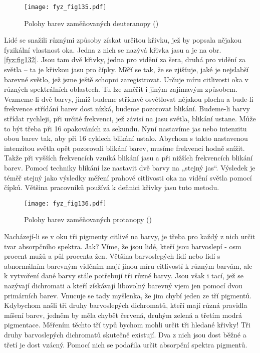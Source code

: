     \begin{figure}[ht!]   %
      \centering
      \texttt{[image: fyz\_fig135.pdf]}
      \caption{Polohy barev zaměňovaných deuteranopy
              (\cite[s.~476]{Feynman01})}
      \label{fyz:fig135}
    \end{figure}
    Lidé se snažili různými způsoby získat určitou křivku, jež by popsala 
    nějakou fyzikální vlastnost oka. Jedna z nich se nazývá křivka jasu a je na obr. 
    \ref{fyz:fig132}. Jsou tam dvě křivky, jedna pro vidění za šera, druhá pro vidění za světla – 
    ta je křivkou jasu pro čípky. Měří se tak, že se zjišťuje, jaké je nejslabší barevné světlo, 
    jež jsme ještě schopni zaregistrovat. Určuje míru citlivosti oka v různých spektrálních 
    oblastech. Tu lze změřit i jiným zajímavým způsobem. Vezmeme-li dvě barvy, jimiž budeme 
    střídavě osvětlovat nějakou plochu a bude-li frekvence střídání barev dost nízká, budeme 
    pozorovat blikání. Budeme-li barvy střídat rychleji, při určité frekvenci, jež závisí na jasu 
    světla, blikání ustane. Může to být třeba při \num{16} opakováních za sekundu. Nyní nastavíme 
    jas nebo intenzitu obou barev tak, aby při \num{16} cyklech blikání ustalo. Abychom s takto 
    nastavenou intenzitou světla opět pozorovali blikání barev, musíme frekvenci hodně snížit. 
    Takže při vyšších frekvencích vzniká blikání jasu a při nižších frekvencích blikání barev. 
    Pomocí techniky blikání lze nastavit dvě barvy na „stejný jas“. Výsledek je téměř stejný jako 
    výsledky měření prahové citlivosti oka na vidění světla pomocí čípků. Většina pracovníků 
    používá k definici křivky jasu tuto metodu.

    \begin{figure}[ht!]  %
      \centering
      \texttt{[image: fyz\_fig136.pdf]}
      \caption{Polohy barev zaměňovaných protanopy
              (\cite[s.~477]{Feynman01})}
      \label{fyz:fig136}
    \end{figure}
    Nacházejí-li se v oku tři pigmenty citlivé na barvy, je třeba pro každý z nich určit tvar 
    absorpčního spektra. Jak? Víme, že jsou lidé, kteří jsou barvoslepí - osm procent mužů a půl 
    procenta žen. Většina barvoslepých lidí nebo lidí s abnormálním barevným viděním mají jinou 
    míru citlivostí k různým barvám, ale k vytvoření dané barvy stále potřebují tři různé barvy. 
    Jsou však i tací, jež se nazývají dichromati a kteří získávají libovolný barevný vjem jen 
    pomocí dvou primárních barev. Vnucuje se tady myšlenka, že jim chybí jeden ze tří pigmentů. 
    Kdybychom našli tři druhy barvoslepých dichromatů, kteří mají různá pravidla míšení barev, 
    jedněm by měla chybět červená, druhým zelená a třetím modrá pigmentace. Měřením těchto tří typů 
    bychom mohli určit tři hledané křivky! Tři druhy barvoslepých dichromatů skutečně existují. Dva 
    z nich jsou dost běžné a třetí je dost vzácný. Pomocí nich se podařila určit absorpční spektra 
    pigmentů.

